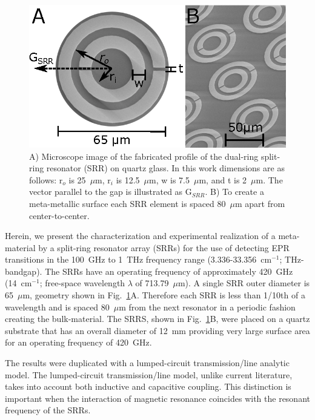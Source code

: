 \begin{figure}[htpb]
\centering
  \includegraphics{Kapitel/Ch3-Images/01-Measurements.eps}%
  \caption[Microscope image of the SRR geometry.]{ A) Microscope image of the fabricated profile of the dual-ring split-ring resonator (SRR) on quartz glass. In this work dimensions are as follows: r$_o$ is 25~$\mu$m, r$_i$ is 12.5~$\mu$m, w is 7.5~$\mu$m, and t is 2~$\mu$m. The vector parallel to the gap is illustrated as G$_{SRR}$. B) To create a meta-metallic surface each SRR element is spaced 80~$\mu$m apart from center-to-center.}
  \label{ch3-fig:sizes}
\end{figure}

Herein, we present the characterization and experimental realization of a meta-material by a split-ring resonator array (SRRs) for the use of detecting EPR transitions in the 100~GHz to 1~THz frequency range (3.336-33.356~cm$^{-1}$; THz-bandgap). The SRRs have an operating frequency of approximately 420~GHz (14~cm$^{-1}$; free-space wavelength $\lambda$ of 713.79~$\mu$m). A single SRR outer diameter is 65~$\mu$m, geometry shown in Fig.~\ref{ch3-fig:sizes}A. Therefore each SRR is less than 1/10th of a wavelength and is spaced 80~$\mu$m from the next resonator in a periodic fashion creating the bulk-material. The SRRS, shown in Fig.~\ref{ch3-fig:sizes}B, were placed on a quartz substrate that has an overall diameter of 12~mm providing very large surface area for an operating frequency of 420~GHz.

The results were duplicated with a lumped-circuit transmission\-/line analytic model. The lumped-circuit transmission\-/line model, unlike current literature, takes into account both inductive and capacitive coupling. This distinction is important when the interaction of magnetic resonance coincides with the resonant frequency of the SRRs.

